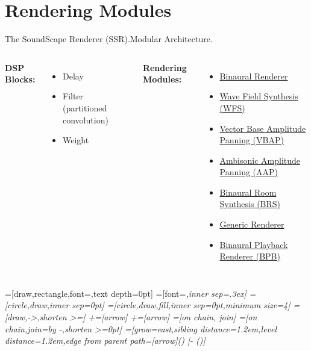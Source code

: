 \documentclass{beamer}
\begin{document}
\section{Rendering Modules}

\begin{frame}{The SoundScape Renderer (SSR).}{Modular Architecture.}
\label<2>{reproductionmethods}
\begin{columns}[t]
\textbf{DSP Blocks:}
\begin{itemize}
\item Delay
\item Filter (partitioned convolution)
\item Weight
\end{itemize}
\textbf{Rendering Modules:}
\begin{itemize}
\item \hyperlink{binaural}{Binaural Renderer}
\item \hyperlink{wfs}{Wave Field Synthesis (WFS)}
\item \hyperlink{vbap}{Vector Base Amplitude Panning (VBAP)}
\item \hyperlink{aap}{Ambisonic Amplitude Panning (AAP)}
\item \hyperlink{brs}{Binaural Room Synthesis (BRS)}
\item \hyperlink{generic}{Generic Renderer}
\item \hyperlink{bpb}{Binaural Playback Renderer (BPB)}
\end{itemize}
\end{columns}
\end{frame}

\newcommand{\distance}{1.2em}
\newcommand{\paralleldistance}{.7ex}
\tikzset{>=stealth} %
=[draw,rectangle,font=\sffamily,text depth=0pt]
=[font=\em\sffamily,inner sep=.3ex]
=[circle,draw,inner sep=0pt]
=[circle,draw,fill,inner sep=0pt,minimum size=4\pgflinewidth]
=[draw,->,shorten >=\pgflinewidth]
+=[arrow]
+=[arrow]
=[on chain, join]
=[on chain,join={by -,shorten >=0pt}]
=[{grow=east,sibling distance=\distance,level distance=\distance,edge from parent path=[arrow](\tikzparentnode\tikzparentanchor) |- (\tikzchildnode\tikzchildanchor)}]
\tikzset{node distance=\distance and \distance}
\end{document}
